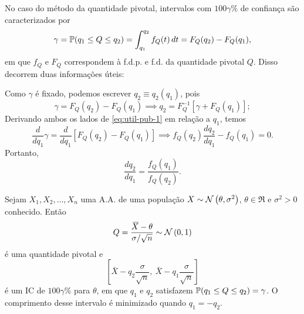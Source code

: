 \begin{note}
No caso do método da quantidade pivotal, intervalos com $100\gamma\%$ de confiança são caracterizados por
\begin{equation}
\gamma = \P(q_1\leq Q\leq q_2) = \int_{q_1}^{q_2} f_Q(t)\,dt = F_Q(q_2)-F_Q(q_1), \label{eq:util-pub-1}
\end{equation}
em que $f_Q$ e $F_Q$ correspondem à f.d.p. e f.d. da quantidade pivotal $Q$. Disso decorrem duas informações úteis:
\begin{outline}
	\1 Como $\gamma$ é fixado, podemos escrever $q_2\equiv q_2(q_1)$, pois
	\begin{equation}
	\gamma = F_Q(q_2)-F_Q(q_1) \implies q_2 = F_Q^{-1}[\gamma+F_Q(q_1)];
	\end{equation}
	\1 Derivando ambos os lados de \eqref{eq:util-pub-1} em relação a $q_1$, temos
	\begin{equation}
	\frac{d}{dq_1}\gamma = \frac{d}{dq_1}\left[F_Q(q_2)-F_Q(q_1)\right] \implies f_Q(q_2)\frac{dq_2}{dq_1}-f_Q(q_1) = 0.
	\end{equation}
	Portanto,
	\begin{equation}
	\frac{dq_2}{dq_1} = \frac{f_Q(q_1)}{f_Q(q_2)}. \label{eq:dq2dq1}
	\end{equation}
\end{outline}
\end{note}

\begin{theorem}
Sejam $X_1,X_2,\ldots,X_n$ uma A.A. de uma população $X\sim\normdist{\theta,\sigma^2}$, $\theta\in\Re$ e $\sigma^2>0$ conhecido. Então
\begin{equation}
Q = \frac{\bar{X}-\theta}{\sigma/\sqrt{n}} \sim \normdist{0,1}
\end{equation}
é uma quantidade pivotal e
\begin{equation}
\left[\bar{X}-q_2\frac{\sigma}{\sqrt{n}},\ \bar{X}-q_1\frac{\sigma}{\sqrt{n}}\right]
\end{equation}
é um IC de $100\gamma\%$ para $\theta$, em que $q_1$ e $q_2$ satisfazem $\P(q_1\leq Q\leq q_2)=\gamma$. O comprimento desse intervalo é minimizado quando $q_1=-q_2$.
\end{theorem}

